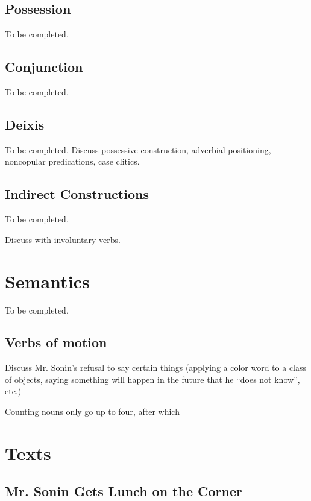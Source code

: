 \documentclass[pdftex,12pt,letterpaper]{article}
\let\ipa\textipa
\begin{document}
 \subsection{Possession}

 To be completed.

 \subsection{Conjunction}

 To be completed.

 \subsection{Deixis}

 To be completed. Discuss possessive construction, adverbial positioning, noncopular predications, case clitics.

 \subsection{Indirect Constructions}

 To be completed.

 Discuss \emph{\ipa{\textltailn e}} with involuntary verbs.

 \section{Semantics}

 To be completed.

 \subsection{Verbs of motion}

 Discuss Mr. Sonin's refusal to say certain things (applying a color word to a class of objects, saying something will happen in the future that he ``does not know'', etc.)

 Counting nouns only go up to four, after which 


 \pagebreak
 \section{Texts}

 \subsection{Mr. Sonin Gets Lunch on the Corner}
\end{document}
